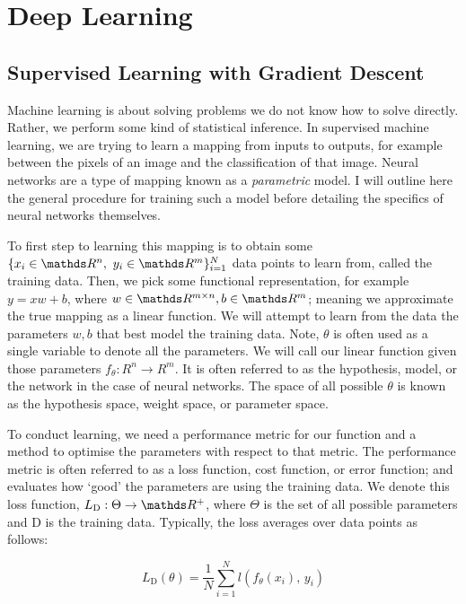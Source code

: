 \section{Deep Learning}
\subsection{Supervised Learning with Gradient Descent}
Machine learning is about solving problems we do not know how to solve directly.
Rather, we perform some kind of statistical inference.
In supervised machine learning, we are trying to learn a mapping from inputs to outputs, for example between the pixels of an image and the classification of that image.
Neural networks are a type of mapping known as a \textit{parametric} model.
I will outline here the general procedure for training such a model before detailing the specifics of neural networks themselves.

To first step to learning this mapping is to obtain some \(\{x_i \in \R^n, \ y_i \in \R^m\}_{i=1}^N\) data points to learn from, called the training data.
Then, we pick some functional representation, for example \(y = xw + b\), where \(w \in \R^{m \times n}, b \in \R^m\); meaning we approximate the true mapping as a linear function.
We will attempt to learn from the data the parameters \(w, b\) that best model the training data.
Note, \(\theta\) is often used as a single variable to denote all the parameters.
We will call our linear function given those parameters \(f_\theta : R^n \rightarrow R^m\).
It is often referred to as the hypothesis, model, or the network in the case of neural networks. The space of all possible \(\theta\) is known as the hypothesis space, weight space, or parameter space.

To conduct learning, we need a performance metric for our function and a method to optimise the parameters with respect to that metric. The performance metric is often referred to as a loss function, cost function, or error function; and evaluates how `good' the parameters are using the training data. We denote this loss function, \(L_\mathrm{D} : \Theta \rightarrow \R^+\), where \(\Theta\) is the set of all possible parameters and \(\mathrm{D}\) is the training data. Typically, the loss averages over data points as follows:

\begin{equation*}
    L_\mathrm{D}(\theta) = \frac{1}{N}\sum_{i=1}^N l(f_\theta(x_i),\, y_i)
\end{equation*}

